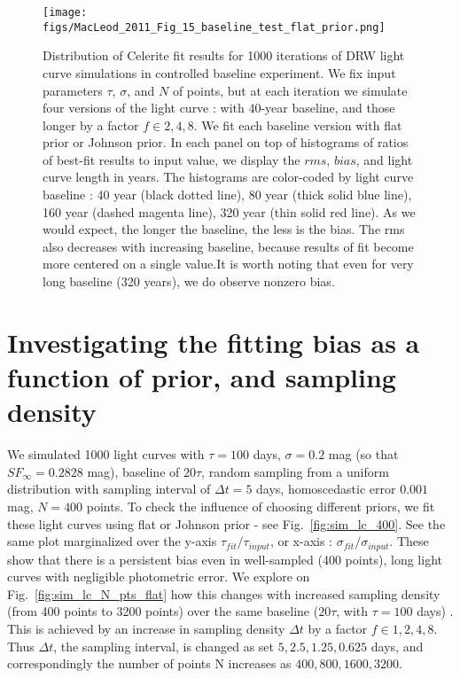 \documentclass[fleqn,usenatbib]{mnras}  %
\begin{document}
\begin{figure}
\texttt{[image: figs/MacLeod\_2011\_Fig\_15\_baseline\_test\_flat\_prior.png]}
\caption{Distribution of Celerite fit results for 1000 iterations of DRW light curve simulations in controlled baseline experiment.  We fix input parameters $\tau$, $\sigma$, and $N$ of points,  but at each iteration we simulate four versions of the light curve  : with 40-year baseline, and those longer by a factor $f \in {2,4,8}$. We fit each baseline version with flat prior or Johnson prior. In each panel  on top of histograms of ratios of best-fit results to input value, we display the $rms$, $bias$, and light curve length in years. The histograms are color-coded by light curve baseline : 40 year (black dotted line), 80 year (thick solid blue line), 160 year (dashed magenta line), 320 year (thin solid red line). As we would expect, the longer the baseline, the less is the bias. The rms also decreases with increasing baseline, because results of fit become more centered on a single value.It is worth noting that even for very long baseline (320 years), we do observe nonzero bias.  }
\label{fig:macleod11_15_baseline}
\end{figure}


\section{Investigating the fitting bias as a function of prior, and sampling density}
We simulated 1000 light curves with $\tau=100$ days, $\sigma=0.2$ mag (so that $SF_{\infty}=0.2828$ mag), baseline of $20 \tau$, random sampling from  a uniform distribution with sampling interval of $\Delta t=5$ days,   homoscedastic error $0.001$ mag, $N=400$ points. To check the influence of choosing different priors, we fit these light curves  using flat or Johnson prior - see Fig.~\ref{fig:sim_lc_400}. See the same plot marginalized over the y-axis $\tau_{fit} / \tau_{input}$, or x-axis : $\sigma_{fit} / \sigma_{input}$. These show that there is a persistent bias even in well-sampled (400 points), long light curves with negligible photometric error. We explore on Fig.~\ref{fig:sim_lc_N_pts_flat} how this changes with increased sampling density (from 400 points to 3200 points) over the same baseline ($20 \tau$, with $\tau=100$ days) . This is achieved by an increase in sampling density $\Delta t$ by a factor $f \in {1,2,4,8}$. Thus $\Delta t$, the sampling interval, is changed as set ${5,2.5, 1.25, 0.625} $ days, and correspondingly the number of points N increases as ${400,800,1600,3200}$.
\end{document}
